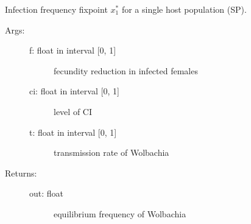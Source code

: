 \documentclass[letterpaper,10pt,english]{sphinxmanual}
\begin{document}
\begin{fulllineitems}
\label{index:wspec.analytical.fix1_SP}
Infection frequency fixpoint $x_1^{\ast}$ for a single host population (SP).
\begin{description}
\item[{Args:}] \leavevmode\begin{description}
\item[{f: float in interval {[}0, 1{]}}] \leavevmode
fecundity reduction in infected females

\item[{ci: float in interval {[}0, 1{]}}] \leavevmode
level of CI

\item[{t: float in interval {[}0, 1{]}}] \leavevmode
transmission rate of Wolbachia

\end{description}

\item[{Returns:}] \leavevmode\begin{description}
\item[{out: float}] \leavevmode
equilibrium frequency of Wolbachia

\end{description}

\end{description}

\end{fulllineitems}

\end{document}
